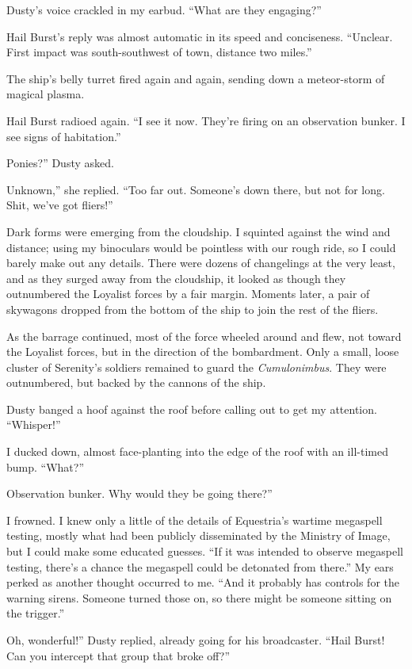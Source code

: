 Dusty’s voice crackled in my earbud. “What are they engaging?”

Hail Burst’s reply was almost automatic in its speed and conciseness. “Unclear. First impact was south-southwest of town, distance two miles.”

The ship’s belly turret fired again and again, sending down a meteor-storm of magical plasma.

Hail Burst radioed again. “I see it now. They’re firing on an observation bunker. I see signs of habitation.”

\leavevmode{}Ponies?” Dusty asked.

\leavevmode{}Unknown,” she replied. “Too far out. Someone’s down there, but not for long. Shit, we’ve got fliers!”

Dark forms were emerging from the cloudship. I squinted against the wind and distance; using my binoculars would be pointless with our rough ride, so I could barely make out any details. There were dozens of changelings at the very least, and as they surged away from the cloudship, it looked as though they outnumbered the Loyalist forces by a fair margin. Moments later, a pair of skywagons dropped from the bottom of the ship to join the rest of the fliers.

As the barrage continued, most of the force wheeled around and flew, not toward the Loyalist forces, but in the direction of the bombardment. Only a small, loose cluster of Serenity’s soldiers remained to guard the \textit{Cumulonimbus}. They were outnumbered, but backed by the cannons of the ship.

Dusty banged a hoof against the roof before calling out to get my attention. “Whisper!”

I ducked down, almost face-planting into the edge of the roof with an ill-timed bump. “What?”

\leavevmode{}Observation bunker. Why would they be going there?”

I frowned. I knew only a little of the details of Equestria’s wartime megaspell testing, mostly what had been publicly disseminated by the Ministry of Image, but I could make some educated guesses. “If it was intended to observe megaspell testing, there’s a chance the megaspell could be detonated from there.” My ears perked as another thought occurred to me. “And it probably has controls for the warning sirens. Someone turned those on, so there might be someone sitting on the trigger.”

\leavevmode{}Oh, wonderful!” Dusty replied, already going for his broadcaster. “Hail Burst! Can you intercept that group that broke off?”

